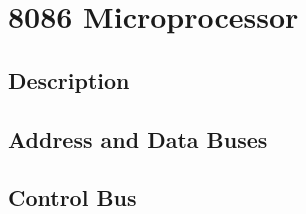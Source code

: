 \newpage
\section{8086 Microprocessor}

    \subsection{Description}

    \subsection{Address and Data Buses}

    \subsection{Control Bus}